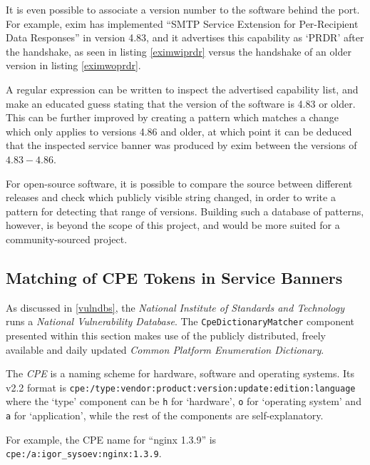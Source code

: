 \documentclass[a4paper,12pt]{article}
\begin{document}
	It is even possible to associate a version number to the software behind the port. For example, exim has implemented ``SMTP Service Extension for Per-Recipient Data Responses'' in version 4.83, and it advertises this capability as `PRDR' after the handshake, as seen in listing \ref{eximwiprdr} versus the handshake of an older version in listing \ref{eximwoprdr}.
	
	A regular expression can be written to inspect the advertised capability list, and make an educated guess stating that the version of the software is 4.83 or older. This can be further improved by creating a pattern which matches a change which only applies to versions 4.86 and older, at which point it can be deduced that the inspected service banner was produced by exim between the versions of $4.83-4.86$.
	
	For open-source software, it is possible to compare the source between different releases and check which publicly visible string changed, in order to write a pattern for detecting that range of versions. Building such a database of patterns, however, is beyond the scope of this project, and would be more suited for a community-sourced project.
	
\subsection{Matching of CPE Tokens in Service Banners} \label{matchcpe}
 

	As discussed in \ref{vulndbs}, the \textit{National Institute of Standards and Technology} runs a \textit{National Vulnerability Database}. The \texttt{CpeDictionaryMatcher} component presented within this section makes use of the publicly distributed, freely available and daily updated \textit{Common Platform Enumeration Dictionary}.
	
	The \textit{CPE} is a naming scheme for hardware, software and operating systems\cite{cpe22}. Its v2.2 format is \texttt{cpe:/type:vendor:product:version:update:edition:language} where the `type' component can be \texttt{h} for `hardware', \texttt{o} for `operating system' and \texttt{a} for `application', while the rest of the components are self-explanatory.
	
	For example, the CPE name for ``nginx 1.3.9'' is \texttt{cpe:/a:igor_sysoev:nginx:1.3.9}.
	
\end{document}
